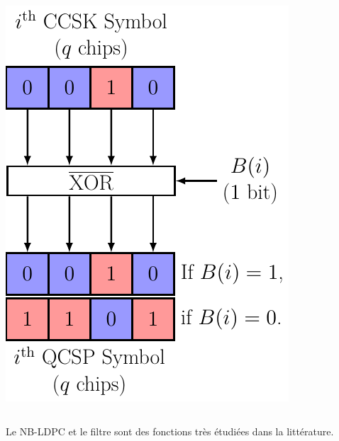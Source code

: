 \documentclass[../main.tex]{subfiles}
\begin{document}
\begin{frame}{\subsecname}
\begin{columns}
\begin{column}{.35\linewidth}
\begin{overlayarea}{\linewidth}{.5\textheight}
        \includegraphics[width=\linewidth, height=.55\textheight, keepaspectratio = true]{figures/tikzpicture/ovmod_simd_stdl.pdf}
      \end{overlayarea}
    \end{column}
  \end{columns}

  \vspace{4 em}

  \begin{center}
    Le NB-LDPC et le filtre sont des fonctions très étudiées dans la littérature.
  \end{center}
\end{frame}
\end{document}
